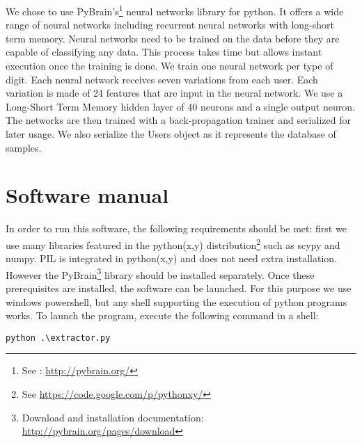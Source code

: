 \documentclass[a4paper]{article}
\begin{document}
{We chose to use PyBrain’s\footnote{See : \url{http://pybrain.org/}} neural networks library for python. It offers a wide range of neural networks including recurrent neural networks with long-short term memory. Neural networks need to be trained on the data before they are capable of classifying any data. This process takes time but allows instant execution once the training is done. We train one neural network per type of digit. Each neural network receives seven variations from each user. Each variation is made of 24 features that are input in the neural network. We use a Long-Short Term Memory hidden layer of 40 neurons and a single output neuron.  The networks are then trained with a back-propagation trainer and serialized for later usage. We also serialize the Users object as it represents the database of samples.

\section{Software manual}

In order to run this software, the following requirements should be met: first we use many libraries featured in the python(x,y) distribution\footnote{See \url{https://code.google.com/p/pythonxy/}} such as scypy and numpy. PIL is integrated in python(x,y) and does not need extra installation. However the PyBrain\footnote{Download and installation documentation: \url{http://pybrain.org/pages/download}} library should be installed separately. Once these prerequisites are installed, the software can be launched. For this purpose we use windows powershell, but any shell supporting the execution of python programs works. To launch the program, execute the following command in a shell:

\vspace{2mm}
\begin{lstlisting}
python .\extractor.py
\end{lstlisting}
\vspace{2mm}

}
\end{document}
